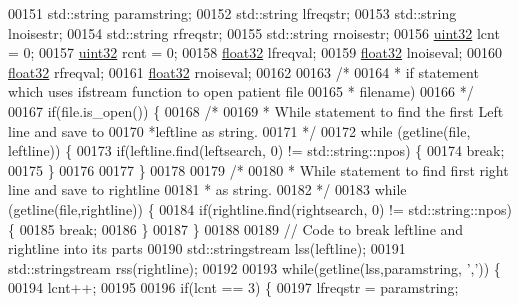 \begin{DoxyCode}
00151         std::string paramstring;
00152         std::string lfreqstr;
00153         std::string lnoisestr;
00154         std::string rfreqstr;
00155         std::string rnoisestr;
00156         \hyperlink{definitions_8hpp_a1134b580f8da4de94ca6b1de4d37975e}{uint32} lcnt = 0;
00157         \hyperlink{definitions_8hpp_a1134b580f8da4de94ca6b1de4d37975e}{uint32} rcnt = 0;
00158         \hyperlink{definitions_8hpp_aacdc525d6f7bddb3ae95d5c311bd06a1}{float32} lfreqval;
00159         \hyperlink{definitions_8hpp_aacdc525d6f7bddb3ae95d5c311bd06a1}{float32} lnoiseval;
00160         \hyperlink{definitions_8hpp_aacdc525d6f7bddb3ae95d5c311bd06a1}{float32} rfreqval;
00161         \hyperlink{definitions_8hpp_aacdc525d6f7bddb3ae95d5c311bd06a1}{float32} rnoiseval;
00162 
00163         \textcolor{comment}{/*}
00164 \textcolor{comment}{         * if statement which uses ifstream function to open patient file }
00165 \textcolor{comment}{         * filename)}
00166 \textcolor{comment}{         */}
00167         \textcolor{keywordflow}{if}(file.is\_open()) \{
00168             \textcolor{comment}{/*}
00169 \textcolor{comment}{             * While statement to find the first Left line and save to }
00170 \textcolor{comment}{             *leftline as string.}
00171 \textcolor{comment}{             */}
00172             \textcolor{keywordflow}{while} (getline(file, leftline)) \{
00173                 \textcolor{keywordflow}{if}(leftline.find(leftsearch, 0) != std::string::npos) \{
00174                     \textcolor{keywordflow}{break};
00175                 \}
00176 
00177             \}
00178 
00179             \textcolor{comment}{/*}
00180 \textcolor{comment}{             * While statement to find first right line and save to rightline}
00181 \textcolor{comment}{             * as string.}
00182 \textcolor{comment}{             */}
00183             \textcolor{keywordflow}{while} (getline(file,rightline)) \{
00184                 \textcolor{keywordflow}{if}(rightline.find(rightsearch, 0) != std::string::npos) \{
00185                     \textcolor{keywordflow}{break};
00186                 \}
00187             \}
00188 
00189             \textcolor{comment}{// Code to break leftline and rightline into its parts}
00190             std::stringstream lss(leftline);
00191             std::stringstream rss(rightline);
00192 
00193             \textcolor{keywordflow}{while}(getline(lss,paramstring, \textcolor{charliteral}{','})) \{
00194                 lcnt++;
00195 
00196                 \textcolor{keywordflow}{if}(lcnt == 3) \{
00197                     lfreqstr = paramstring;

\end{DoxyCode}
